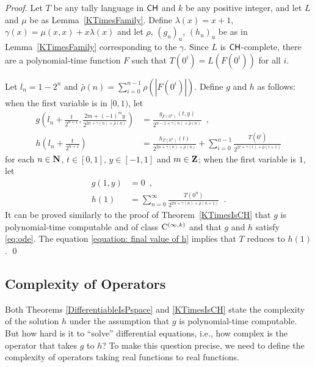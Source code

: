 \begin{proof}
Let $T$ be any tally language in $\mathsf{CH}$ and $k$ be any positive integer,
and let $L$ and $\mu$ be as Lemma~\ref{KTimesFamily}.
Define $
\lambda(x) = x + 1
$, $
\gamma(x) = \mu(x, x) + x \lambda(x)
$ and let $\rho$, $(g_u)_u$, $(h_u)_u$ be  as in Lemma~\ref{KTimesFamily} 
corresponding to the $\gamma$.
Since $L$ is $\mathsf{CH}$-complete,
there are a polynomial-time function $F$ such that 
$T (0 ^i) =  L(F(0 ^i))$ for all $i$. 

Let $
l_n = 1 - 2^n
$ and $
\bar{\rho}(n) = \sum^{n-1}_{i = 0} \rho(|F(0 ^i)|)
$.  Define $g$ and $h$ as follows: 
when the first variable is in $[0,1)$, let
\begin{align}
 g \left(l_n + \frac{t}{2^{n+1}}, \frac{2m+(-1)^m y}{2^{2n+\gamma(n)+\bar{\rho}(n)}} \right)
 &=
 \frac{g_{F(0^n)}(t, y)}{2^{n-1+\gamma(n)+\bar{\rho}(n)}} \enspace ,
 \\
 h \left( l_n + \frac{t}{2^{n+1}} \right)
 &=
 \frac{h_{F(0^n)}(t)}{2^{2n+\gamma(n)+\bar{\rho}(n)}}
 + \sum^{n-1}_{i = 0} \frac{T (0^i)}{2^{2 i + \gamma (i) + \bar{\rho} (i + 1)}}
\end{align}
for each $n \in \mathbf N$, $t \in [0,1]$, $y \in [-1, 1]$ and $m \in \mathbf Z$; 
when the first variable is $1$,
let 
\begin{align} 
  g(1, y) 
&
 =
  0 \enspace, 
\\
\label{equation: final value of h}
  h(1) 
&
 = 
 \sum^\infty_{n = 0} \frac{T (0^n)}{2^{2n+\gamma(n)+\bar{\rho}(n+1)}} \enspace. 
\end{align}
It can be proved similarly to the proof of Theorem~\ref{KTimesIsCH} 
that $g$ is polynomial-time computable and of class $\mathrm C ^{(\infty, k)}$
and that $g$ and $h$ satisfy \eqref{eq:ode}.
The equation \eqref{equation: final value of h} implies 
that $T$ reduces to $h(1)$. 
\qed
\end{proof}


\subsection{Complexity of Operators}
\label{section: constructive}

Both Theorems \ref{DifferentiableIsPspace} and \ref{KTimesIsCH}
state the complexity of the solution $h$ under the assumption 
that $g$ is polynomial-time computable.
But how hard is it to ``solve'' differential equations,
i.e., how complex is the operator that takes $g$ to $h$? 
To make this question precise,
we need to define the complexity of operators 
taking real functions to real functions.

